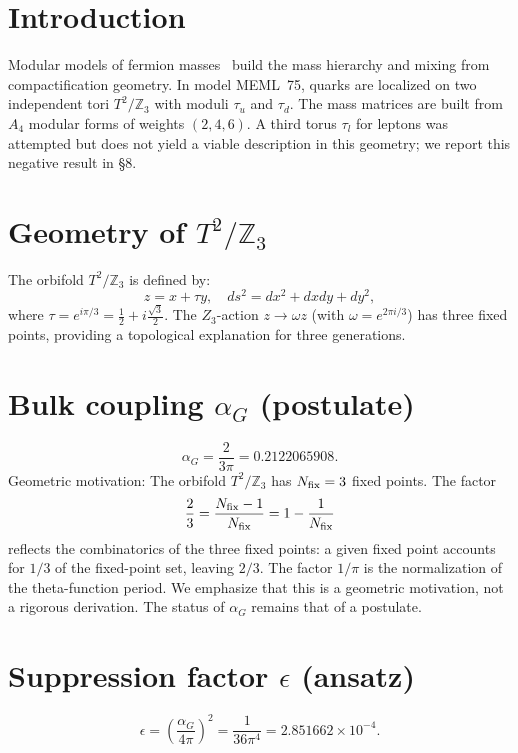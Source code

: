 \documentclass[12pt,a4paper]{article}
\numberwithin{equation}{section}
\begin{document}
\newpage

\section{Introduction}
Modular models of fermion masses~\cite{Feruglio2017,Kobayashi2019} build the mass hierarchy and mixing from compactification geometry. In model MEML~75, quarks are localized on two independent tori \(T^2/\mathbb{Z}_3\) with moduli \(\tau_u\) and \(\tau_d\). The mass matrices are built from \(A_4\) modular forms of weights \((2,4,6)\). A third torus \(\tau_l\) for leptons was attempted but does not yield a viable description in this geometry; we report this negative result in \S8.

\section{Geometry of \(T^2/\mathbb{Z}_3\)}
The orbifold \(T^2/\mathbb{Z}_3\) is defined by:
\begin{equation}
z = x + \tau y,\quad ds^2 = dx^2 +dxdy + dy^2,
\end{equation}
where \(\tau = e^{i\pi/3} = \frac{1}{2} +i\frac{\sqrt{3}}{2}\). The \(Z_3\)-action \(z\to \omega z\) (with \(\omega = e^{2\pi i/3}\)) has three fixed points, providing a topological explanation for three generations.

\section{Bulk coupling \(\alpha_G\) (postulate)}
\begin{equation}
\alpha_G = \frac{2}{3\pi} = 0.2122065908.
\end{equation}
Geometric motivation: The orbifold \(T^2/\mathbb{Z}_3\) has \(N_{\rm fix}=3\) fixed points. The factor
\begin{equation}
\frac{2}{3} = \frac{N_{\rm fix}-1}{N_{\rm fix}} = 1 - \frac{1}{N_{\rm fix}}
\end{equation}
reflects the combinatorics of the three fixed points: a given fixed point accounts for \(1/3\) of the fixed-point set, leaving \(2/3\). The factor \(1/\pi\) is the normalization of the theta-function period. We emphasize that this is a geometric motivation, not a rigorous derivation. The status of \(\alpha_G\) remains that of a postulate.

\section{Suppression factor \(\epsilon\) (ansatz)}
\begin{equation}
\epsilon = \left(\frac{\alpha_G}{4\pi}\right)^2 = \frac{1}{36\pi^4} = 2.851662\times 10^{-4}.
\end{equation}
\end{document}
